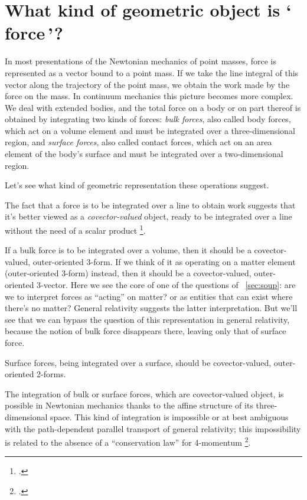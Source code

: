 \documentclass[\ifafour a4paper,12pt,\else a5paper,10pt,\fi%
onecolumn,oneside,article,%
british%
]{memoir}
\newcommand*{\defquote}[1]{`\,#1\,'}
\theoremstyle{remark}
\theoremstyle{innote}
\newcommand*{\citep}{\footcites}
\renewcommand*{\|}[1][]{\nonscript\,#1\vert\nonscript\;\mathopen{}}
\newcommand*{\sect}{\S}%
\newcommand*{\chap}{ch.}%
\newcommand*{\chaps}{chs}%
\newcommand*{\puzzle}{{\fontencoding{U}\fontfamily{fontawesometwo}\selectfont\symbol{225}}}
\newcommand*{\psect}{{\footnotesize\puzzle}}%
\begin{document}
\section{What kind of geometric object is \defquote{force}?}
\label{sec:geometry_force}

In most presentations of the Newtonian mechanics of point masses, force is
represented as a vector bound to a point mass. If we take the line integral
of this vector along the trajectory of the point mass, we obtain the work
made by the force on the mass. In continuum mechanics this picture becomes
more complex. We deal with extended bodies, and the total force on a body
or on part thereof is obtained by integrating two kinds of forces:
\emph{bulk forces}, also called body forces, which act on a volume element
and must be integrated over a three-dimensional region, and \emph{surface
  forces}, also called contact forces, which act on an area element of the
body's surface and must be integrated over a two-dimensional region.

Let's see what kind of geometric representation these operations suggest.

The fact that a force is to be integrated over a line to obtain work
suggests that it's better viewed as a \emph{covector-valued} object, ready
to be integrated over a line without the need of a scalar product
\citep[\sect~12]{burke1995}[\sect~VII.2]{schouten1951}[\sect~2]{vandantzig1954}[\chaps~VI--VII]{burke1985_r1987}[\chap~7]{bambergetal1988_r1990}.

If a bulk force is to be integrated over a volume, then it should be a
covector-valued, outer-oriented 3-form. If we think of it as operating on a
matter element (outer-oriented 3-form) instead, then it should be a
covector-valued, outer-oriented 3-vector. Here we see the core of one of
the questions of \psect~\ref{sec:soup}: are we to interpret forces as
\enquote{acting} on matter? or as entities that can exist where there's no
matter? General relativity suggests the latter interpretation. But we'll
see that we can bypass the question of this representation in general
relativity, because the notion of bulk force disappears there, leaving only
that of surface force.

Surface forces, being integrated over a surface, should be covector-valued,
outer-oriented 2-forms.

The integration of bulk or surface forces, which are covector-valued
object, is possible in Newtonian mechanics thanks to the affine structure of
its three-dimensional space. This kind of integration is impossible or
at best ambiguous with the path-dependent parallel transport of general
relativity; this impossibility is related to the absence of a
\enquote{conservation law} for 4-momentum \citep[\sect~21]{pauli1921_t1958}[\sect~59]{eddington1923_r1930}[\sect~96]{landauetal1939_t1996}[also][]{aldermanetal1970}.
\end{document}
